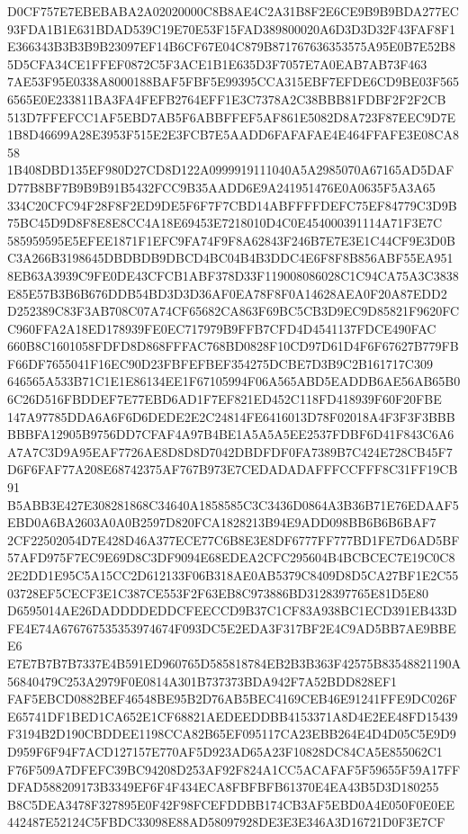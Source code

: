 \documentclass[UTF8,fontset=fandol,zihao=-4,a4paper]{ctexart}
\begin{document}
{{D0CF757E7EBEBABA2A02020000C8B8AE4C2A31B8F2E6CE9B9B9BDA277EC93FDA1B1E631BDAD539C19E70E53F15FAD389800020A6D3D3D32F43FAF8F1
E366343B3B3B9B23097EF14B6CF67E04C879B871767636353575A95E0B7E52B85D5CFA34CE1FFEF0872C5F3ACE1B1E635D3F7057E7A0EAB7AB73F463
7AE53F95E0338A8000188BAF5FBF5E99395CCA315EBF7EFDE6CD9BE03F5656565E0E233811BA3FA4FEFB2764EFF1E3C7378A2C38BBB81FDBF2F2F2CB
513D7FFEFCC1AF5EBD7AB5F6ABBFFEF5AF861E5082D8A723F87EEC9D7E1B8D46699A28E3953F515E2E3FCB7E5AADD6FAFAFAE4E464FFAFE3E08CA858
1B408DBD135EF980D27CD8D122A0999919111040A5A2985070A67165AD5DAFD77B8BF7B9B9B91B5432FCC9B35AADD6E9A241951476E0A0635F5A3A65
334C20CFC94F28F8F2ED9DE5F6F7F7CBD14ABFFFFDEFC75EF84779C3D9B75BC45D9D8F8E8E8CC4A18E69453E7218010D4C0E454000391114A71F3E7C
585959595E5EFEE1871F1EFC9FA74F9F8A62843F246B7E7E3E1C44CF9E3D0BC3A266B3198645DBDBDB9DBCD4BC04B4B3DDC4E6F8F8B856ABF55EA951
8EB63A3939C9FE0DE43CFCB1ABF378D33F119008086028C1C94CA75A3C3838E85E57B3B6B676DDB54BD3D3D36AF0EA78F8F0A14628AEA0F20A87EDD2
D252389C83F3AB708C07A74CF65682CA863F69BC5CB3D9EC9D85821F9620FCC960FFA2A18ED178939FE0EC717979B9FFB7CFD4D4541137FDCE490FAC
660B8C1601058FDFD8D868FFFAC768BD0828F10CD97D61D4F6F67627B779FBF66DF7655041F16EC90D23FBFEFBEF354275DCBE7D3B9C2B161717C309
646565A533B71C1E1E86134EE1F67105994F06A565ABD5EADDB6AE56AB65B06C26D516FBDDEF7E77EBD6AD1F7EF821ED452C118FD418939F60F20FBE
147A97785DDA6A6F6D6DEDE2E2C24814FE6416013D78F02018A4F3F3F3BBBBBBFA12905B9756DD7CFAF4A97B4BE1A5A5A5EE2537FDBF6D41F843C6A6
A7A7C3D9A95EAF7726AE8D8D8D7042DBDFDF0FA7389B7C424E728CB45F7D6F6FAF77A208E68742375AF767B973E7CEDADADAFFFCCFFF8C31FF19CB91
B5ABB3E427E308281868C34640A1858585C3C3436D0864A3B36B71E76EDAAF5EBD0A6BA2603A0A0B2597D820FCA1828213B94E9ADD098BB6B6B6BAF7
2CF22502054D7E428D46A377ECE77C6B8E3E8DF6777FF777BD1FE7D6AD5BF57AFD975F7EC9E69D8C3DF9094E68EDEA2CFC295604B4BCBCEC7E19C0C8
2E2DD1E95C5A15CC2D612133F06B318AE0AB5379C8409D8D5CA27BF1E2C5503728EF5CECF3E1C387CE553F2F63EB8C973886BD3128397765E81D5E80
D6595014AE26DADDDDEDDCFEECCD9B37C1CF83A938BC1ECD391EB433DFE4E74A676767535353974674F093DC5E2EDA3F317BF2E4C9AD5BB7AE9BBEE6
E7E7B7B7B7337E4B591ED960765D585818784EB2B3B363F42575B83548821190A56840479C253A2979F0E0814A301B737373BDA942F7A52BDD828EF1
FAF5EBCD0882BEF46548BE95B2D76AB5BEC4169CEB46E91241FFE9DC026FE65741DF1BED1CA652E1CF68821AEDEEDDBB4153371A8D4E2EE48FD15439
F3194B2D190CBDDEE1198CCA82B65EF095117CA23EBB264E4D4D05C5E9D9D959F6F94F7ACD127157E770AF5D923AD65A23F10828DC84CA5E855062C1
F76F509A7DFEFC39BC94208D253AF92F824A1CC5ACAFAF5F59655F59A17FFDFAD588209173B3349EF6F4F434ECA8FBFBFB61370E4EA43B5D3D180255
B8C5DEA3478F327895E0F42F98FCEFDDBB174CB3AF5EBD0A4E050F0E0EE442487E52124C5FBDC33098E88AD58097928DE3E3E346A3D16721D0F3E7CF
}}
\end{document}
